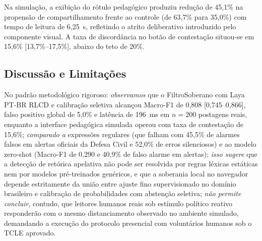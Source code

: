 \documentclass[runningheads]{llncs}
\begin{document}
\begin{table}[t]
\centering
\caption{Resultados do Experimento 2 (8 sessões / 160 decisões simuladas).}\label{tab:resultados_e2}
\end{table}

Na simulação, a exibição do rótulo pedagógico produziu redução de 45,1\% na propensão de compartilhamento frente ao controle (de 63,7\% para 35,0\%) com tempo de leitura de 6,25~s, refletindo o atrito deliberativo introduzido pelo componente visual. A taxa de discordância no botão de contestação situou-se em 15,6\% [13,7\%--17,5\%], abaixo do teto de 20\%.

\subsection{Discussão e Limitações}

No padrão metodológico rigoroso: \textit{observamos} que o FiltroSoberano com Laya PT-BR RLCD e calibração seletiva alcançou Macro-F1 de 0,808 [0,745--0,866], falso positivo global de 5,0\% e latência de 196~ms em $n=200$ postagens reais, enquanto a interface pedagógica simulada operou com taxa de contestação de 15,6\%; \textit{comparado a} expressões regulares (que falham com 45,5\% de alarmes falsos em alertas oficiais da Defesa Civil e 52,0\% de erros silenciosos) e ao modelo zero-shot (Macro-F1 de 0,290 e 40,9\% de falso alarme em alertas); \textit{isso sugere} que a detecção de retórica apelativa não pode ser resolvida por regras léxicas estáticas nem por modelos pré-treinados genéricos, e que a soberania local no navegador depende estritamente da união entre ajuste fino supervisionado no domínio brasileiro e calibração de probabilidades com abstenção seletiva; \textit{não permite concluir}, contudo, que leitores humanos reais sob estímulo político reativo responderão com o mesmo distanciamento observado no ambiente simulado, demandando a execução do protocolo presencial com voluntários humanos sob o TCLE aprovado.
\end{document}
